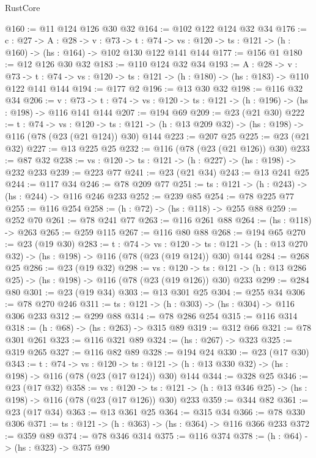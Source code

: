 \begin{lexlean}{RustCore}
\begin{coremodule}
@160 := @11 @124 @126 @30 @32
@164 := @102 @122 @124 @32 @34
@176 := {c : @27} ->
  {A : @28} ->
  {v : @73} ->
  {t : @74} -> {vs : @120} -> {ts : @121} -> (h : @160) -> (hs : @164) -> @102 @130 @122 @141 @144
@177 := @156 @1
@180 := @12 @126 @30 @32
@183 := @110 @124 @32 @34
@193 := {A : @28} ->
  {v : @73} ->
  {t : @74} -> {vs : @120} -> {ts : @121} -> (h : @180) -> (hs : @183) -> @110 @122 @141 @144
@194 := @177 @2
@196 := @13 @30 @32
@198 := @116 @32 @34
@206 := {v : @73} ->
  {t : @74} -> {vs : @120} -> {ts : @121} -> (h : @196) -> (hs : @198) -> @116 @141 @144
@207 := @194 @69
@209 := @23 (@21 @30)
@222 := {t : @74} ->
  {vs : @120} ->
  {ts : @121} -> (h : @13 @209 @32) -> (hs : @198) -> @116 (@78 (@23 (@21 @124)) @30) @144
@223 := @207 @25
@225 := @23 (@21 @32)
@227 := @13 @225 @25
@232 := @116 (@78 (@23 (@21 @126)) @30)
@233 := @87 @32
@238 := {vs : @120} -> {ts : @121} -> (h : @227) -> (hs : @198) -> @232 @233
@239 := @223 @77
@241 := @23 (@21 @34)
@243 := @13 @241 @25
@244 := @117 @34
@246 := @78 @209 @77
@251 := {ts : @121} -> (h : @243) -> (hs : @244) -> @116 @246 @233
@252 := @239 @85
@254 := @78 @225 @77
@255 := @116 @254
@258 := (h : @72) -> (hs : @118) -> @255 @88
@259 := @252 @70
@261 := @78 @241 @77
@263 := @116 @261 @88
@264 := (hs : @118) -> @263
@265 := @259 @115
@267 := @116 @80 @88
@268 := @194 @65
@270 := @23 (@19 @30)
@283 := {t : @74} ->
  {vs : @120} ->
  {ts : @121} -> (h : @13 @270 @32) -> (hs : @198) -> @116 (@78 (@23 (@19 @124)) @30) @144
@284 := @268 @25
@286 := @23 (@19 @32)
@298 := {vs : @120} ->
  {ts : @121} -> (h : @13 @286 @25) -> (hs : @198) -> @116 (@78 (@23 (@19 @126)) @30) @233
@299 := @284 @80
@301 := @23 (@19 @34)
@303 := @13 @301 @25
@304 := @255 @34
@306 := @78 @270 @246
@311 := {ts : @121} -> (h : @303) -> (hs : @304) -> @116 @306 @233
@312 := @299 @88
@314 := @78 @286 @254
@315 := @116 @314
@318 := (h : @68) -> (hs : @263) -> @315 @89
@319 := @312 @66
@321 := @78 @301 @261
@323 := @116 @321 @89
@324 := (hs : @267) -> @323
@325 := @319 @265
@327 := @116 @82 @89
@328 := @194 @24
@330 := @23 (@17 @30)
@343 := {t : @74} ->
  {vs : @120} ->
  {ts : @121} -> (h : @13 @330 @32) -> (hs : @198) -> @116 (@78 (@23 (@17 @124)) @30) @144
@344 := @328 @25
@346 := @23 (@17 @32)
@358 := {vs : @120} ->
  {ts : @121} -> (h : @13 @346 @25) -> (hs : @198) -> @116 (@78 (@23 (@17 @126)) @30) @233
@359 := @344 @82
@361 := @23 (@17 @34)
@363 := @13 @361 @25
@364 := @315 @34
@366 := @78 @330 @306
@371 := {ts : @121} -> (h : @363) -> (hs : @364) -> @116 @366 @233
@372 := @359 @89
@374 := @78 @346 @314
@375 := @116 @374
@378 := (h : @64) -> (hs : @323) -> @375 @90

\end{coremodule}
\end{lexlean}
